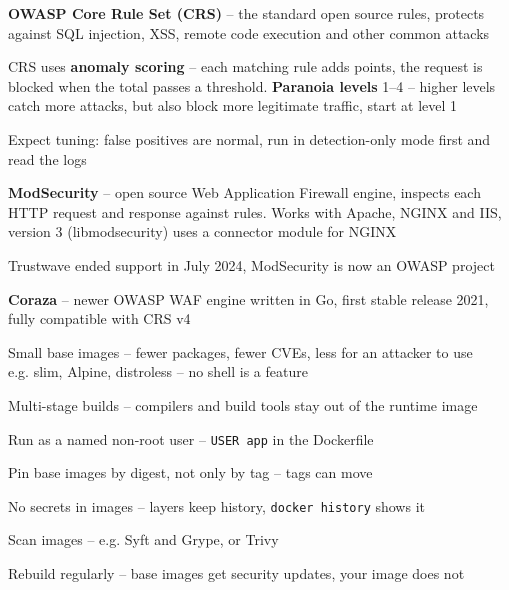 \documentclass[Screen16to9,17pt]{foils}
\begin{document}
\begin{list2}
\item {\bf OWASP Core Rule Set (CRS)} -- the standard open source rules, protects against SQL injection, XSS, remote code execution and other common attacks 
\item CRS uses {\bf anomaly scoring} -- each matching rule adds points, the request is blocked when the total passes a threshold. {\bf Paranoia levels} 1--4 -- higher levels catch more attacks, but also block more legitimate traffic, start at level 1
\item Expect tuning: false positives are normal, run in detection-only mode first and read the logs
\item {\bf ModSecurity} -- open source Web Application Firewall engine, inspects each HTTP request and response against rules. Works with Apache, NGINX and IIS, version 3 (libmodsecurity) uses a connector module for NGINX
\item Trustwave ended support in July 2024, ModSecurity is now an OWASP project\\
\item {\bf Coraza} -- newer OWASP WAF engine written in Go, first stable release 2021, fully compatible with CRS v4\\

\end{list2}




\begin{list2}
\item Small base images -- fewer packages, fewer CVEs, less for an attacker to use\\
e.g. slim, Alpine, distroless -- no shell is a feature
\item Multi-stage builds -- compilers and build tools stay out of the runtime image
\item Run as a named non-root user -- \verb+USER app+ in the Dockerfile
\item Pin base images by digest, not only by tag -- tags can move
\item No secrets in images -- layers keep history, \verb+docker history+ shows it
\item Scan images -- e.g. Syft and Grype, or Trivy
\item Rebuild regularly -- base images get security updates, your image does not
\end{list2}
\end{document}
